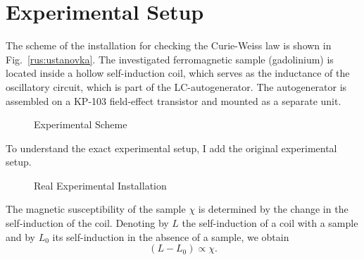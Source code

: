 \documentclass[a4paper, 12pt]{article}%
\begin{document}
\section{Experimental Setup}
The scheme of the installation for checking the Curie-Weiss law is shown in Fig.~\ref{rus:ustanovka}. The investigated ferromagnetic sample (gadolinium) is located inside a hollow self-induction coil, which serves as the inductance of the oscillatory circuit, which is part of the LC-autogenerator. The autogenerator is assembled on a KP-103 field-effect transistor and mounted as a separate unit.
\begin{figure}
		\caption{Experimental Scheme}
		\label{ris:ustanovka}
\end{figure}
	
To understand the exact experimental setup, I add the original experimental setup. 
\begin{figure}
		\caption{Real Experimental Installation}
		\label{ris:ustanovka}
\end{figure} 
	
The magnetic susceptibility of the sample $\chi$ is determined by the change in the self-induction of the coil. Denoting by $L$ the self-induction of a coil with a sample and by $L_0$ its self-induction in the absence of a sample, we obtain
\begin{equation*}
		(L-L_0)\propto \chi.
	\end{equation*}
\end{document}

